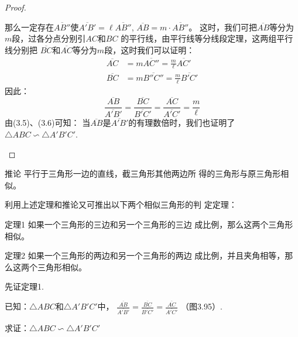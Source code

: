\begin{proof}
\begin{enumerate}
那么一定存在$\overline{AB''}$使$\overline{A'B'}=\ell \overline{AB''}$, $\overline{AB}=m\cdot \overline{AB''}$。
这时，我们可把$\overline{AB}$等分为$m$段，过各分点分别引$AC$和$BC$
的平行线，由平行线等分线段定理，这两组平行线分别把
$\overline{BC}$和$\overline{AC}$等分为$m$段，这时我们可以证明：
\[\begin{split}
    \overline{AC}&=m\overline{AC''}=\frac{m}{\ell}\overline{AC'}\\
    \overline{BC}&=m\overline{B''C''}=\frac{m}{\ell}\overline{B'C'}
\end{split}\]
因此：
\begin{equation}
    \frac{\overline{AB}}{\overline{A'B'}}=\frac{\overline{BC}}{\overline{B'C'}}=\frac{\overline{AC}}{\overline{A'C'}}=\frac{m}{\ell}
\end{equation}
由(3.5)、(3.6)可知：
当$\overline{AB}$是$\overline{A'B'}$的有理数倍时，我们也证明了
$\triangle ABC\backsim \triangle A'B'C'$.
\end{enumerate}
\end{proof}

\begin{blk}
    {推论} 平行于三角形一边的直线，截三角形其他两边所
得的三角形与原三角形相似。
\end{blk}

利用上述定理和推论又可推出以下两个相似三角形的判
定定理：

\begin{blk}
    {定理1}
如果一个三角形的三边和另一个三角形的三边
成比例，那么这两个三角形相似。
\end{blk}

\begin{blk}
    {定理2}
如果一个三角形的两边和另一个三角形的两边
成比例，并且夹角相等，那么这两个三角形相似。
\end{blk}

先证定理1.

已知：$\triangle ABC$和$\triangle A'B'C'$中，
$\frac{\overline{AB}}{\overline{A'B'}}=\frac{\overline{BC}}{\overline{B'C'}}=\frac{\overline{AC}}{\overline{A'C'}}$
（图3.95）.

求证：$\triangle ABC\backsim \triangle A'B'C'$

\begin{figure}[htp]
    \centering
{}
    \caption{}
\end{figure}

